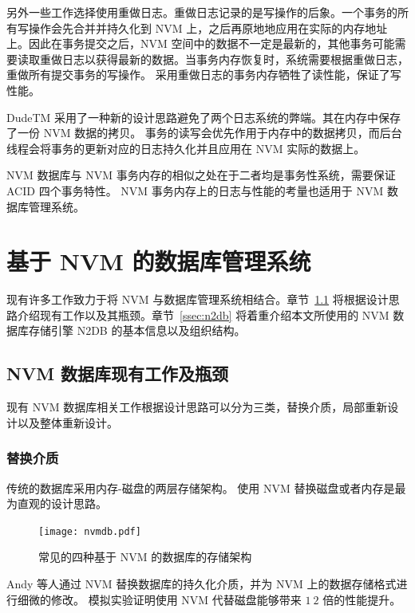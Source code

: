 另外一些工作选择使用重做日志\cite{volos_mnemosyne_2011, giles_softwrap_2015}。重做日志记录的是写操作的后象。一个事务的所有写操作会先合并并持久化到 NVM 上，之后再原地地应用在实际的内存地址上。因此在事务提交之后，NVM 空间中的数据不一定是最新的，其他事务可能需要读取重做日志以获得最新的数据。当事务内存恢复时，系统需要根据重做日志，重做所有提交事务的写操作。
采用重做日志的事务内存牺牲了读性能，保证了写性能。

DudeTM 采用了一种新的设计思路避免了两个日志系统的弊端\cite{liu_dudetm_2017}。其在内存中保存了一份 NVM 数据的拷贝。
事务的读写会优先作用于内存中的数据拷贝，而后台线程会将事务的更新对应的日志持久化并且应用在 NVM 实际的数据上。

NVM 数据库与 NVM 事务内存的相似之处在于二者均是事务性系统，需要保证 ACID 四个事务特性。
NVM 事务内存上的日志与性能的考量也适用于 NVM 数据库管理系统。

\section{基于 NVM 的数据库管理系统}

现有许多工作致力于将 NVM 与数据库管理系统相结合。章节~\ref{ssec:nvmdb} 将根据设计思路介绍现有工作以及其瓶颈。章节~\ref{ssec:n2db} 将着重介绍本文所使用的 NVM 数据库存储引擎 N2DB 的基本信息以及组织结构。

\subsection{NVM 数据库现有工作及瓶颈}
\label{ssec:nvmdb}

现有 NVM 数据库相关工作根据设计思路可以分为三类，替换介质，局部重新设计以及整体重新设计。

\subsubsection{替换介质}

传统的数据库采用内存-磁盘的两层存储架构。
使用 NVM 替换磁盘或者内存是最为直观的设计思路。

\begin{figure}
    \centering
    \texttt{[image: nvmdb.pdf]}
    \caption{常见的四种基于 NVM 的数据库的存储架构}
    \label{fig:nvm-structure}
\end{figure}

Andy 等人通过 NVM 替换数据库的持久化介质，并为 NVM 上的数据存储格式进行细微的修改\cite{arulraj_lets_2015,arulraj_how_2017}。
模拟实验证明使用 NVM 代替磁盘能够带来 $1~2$ 倍的性能提升。

